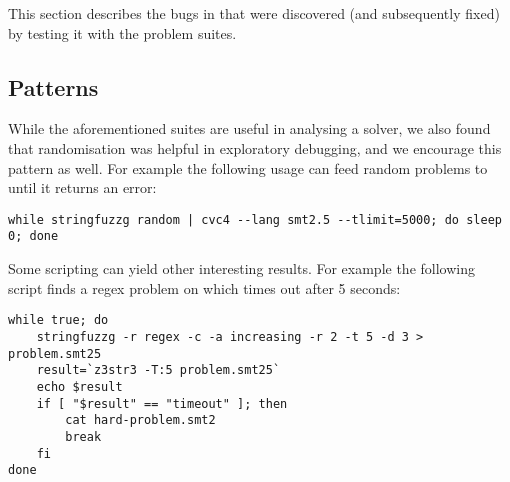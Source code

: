         This section describes the bugs in \us{} that were discovered (and subsequently fixed) by testing it with the \fuzzer{} problem suites.


    \subsection{Patterns}

        While the aforementioned suites are useful in analysing a solver, we also found that randomisation was helpful in exploratory debugging, and we encourage this pattern as well. For example the following usage can feed random problems to \cvc{} until it returns an error:

        {\scriptsize\begin{verbatim}
while stringfuzzg random | cvc4 --lang smt2.5 --tlimit=5000; do sleep 0; done\end{verbatim}}

        Some \unix{} scripting can yield other interesting results. For example the following script finds a regex problem on which \us{} times out after 5 seconds:

        {\scriptsize\begin{verbatim}while true; do
    stringfuzzg -r regex -c -a increasing -r 2 -t 5 -d 3 > problem.smt25
    result=`z3str3 -T:5 problem.smt25`
    echo $result
    if [ "$result" == "timeout" ]; then
        cat hard-problem.smt2
        break
    fi
done\end{verbatim}}
